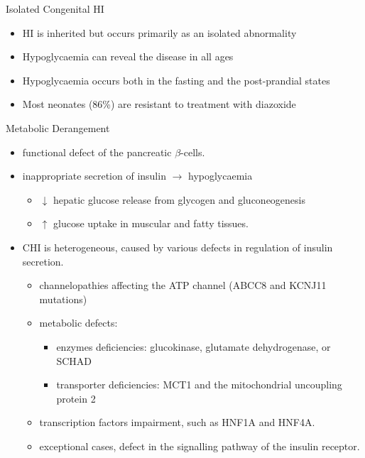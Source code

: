 \documentclass[presentation, smaller]{beamer}
\begin{document}
\begin{frame}[label={sec:orgd0678c1}]{Isolated Congenital HI}
\begin{itemize}
\item HI is inherited but occurs primarily as an isolated abnormality
\item Hypoglycaemia can reveal the disease in all ages
\item Hypoglycaemia occurs both in the fasting and the post-prandial states
\item Most neonates (86\%) are resistant to treatment with diazoxide
\end{itemize}
\end{frame}

\begin{frame}[label={sec:org97c9903}]{Metabolic Derangement}
\begin{itemize}
\item functional defect of the pancreatic \(\beta\)-cells.
\item inappropriate secretion of insulin \(\to\) hypoglycaemia
\begin{itemize}
\item \(\downarrow\) hepatic glucose release from glycogen and gluconeogenesis
\item \(\uparrow\) glucose uptake in muscular and fatty tissues.
\end{itemize}
\item CHI is heterogeneous, caused by various defects in regulation of insulin secretion.
\begin{itemize}
\item channelopathies affecting the ATP channel (ABCC8 and KCNJ11 mutations)
\item metabolic defects:
\begin{itemize}
\item enzymes deficiencies: glucokinase, glutamate dehydrogenase, or SCHAD
\item transporter deficiencies: MCT1 and the mitochondrial uncoupling protein 2
\end{itemize}
\item transcription factors impairment, such as HNF1A and HNF4A.
\item exceptional cases, defect in the signalling pathway of the insulin
receptor.
\end{itemize}
\end{itemize}
\end{frame}
\end{document}
